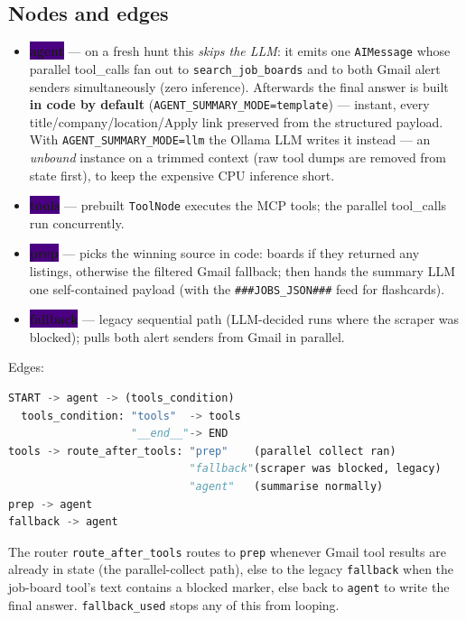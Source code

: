 \documentclass[11pt,a4paper]{article}
\newcommand{\tool}[1]{\texttt{#1}}
\newcommand{\nodepill}[1]{{\footnotesize\bfseries\color{white}\colorbox{indigo}{#1}}}
\begin{document}
\subsection{Nodes and edges}
\begin{itemize}
  \item \nodepill{agent} --- on a fresh hunt this \emph{skips the LLM}: it emits
        one \tool{AIMessage} whose parallel tool\_calls fan out to
        \tool{search\_job\_boards} and to both Gmail alert senders
        simultaneously (zero inference). Afterwards the final answer is built
        \textbf{in code by default} (\tool{AGENT\_SUMMARY\_MODE=template}) ---
        instant, every title/company/location/Apply link preserved from the
        structured payload. With \tool{AGENT\_SUMMARY\_MODE=llm} the Ollama LLM
        writes it instead --- an \emph{unbound} instance on a trimmed context
        (raw tool dumps are removed from state first), to keep the expensive
        CPU inference short.\par\nopagebreak
  \item \nodepill{tools} --- prebuilt \tool{ToolNode} executes the MCP tools;
        the parallel tool\_calls run concurrently.
  \item \nodepill{prep} --- picks the winning source in code: boards if they
        returned any listings, otherwise the filtered Gmail fallback; then
        hands the summary LLM one self-contained payload (with the
        \tool{###JOBS\_JSON###} feed for flashcards).
  \item \nodepill{fallback} --- legacy sequential path (LLM-decided runs where
        the scraper was blocked); pulls both alert senders from Gmail in
        parallel.
\end{itemize}

Edges:
\begin{lstlisting}[language=Python]
START -> agent -> (tools_condition)
  tools_condition: "tools"  -> tools
                   "__end__"-> END
tools -> route_after_tools: "prep"    (parallel collect ran)
                            "fallback"(scraper was blocked, legacy)
                            "agent"   (summarise normally)
prep -> agent
fallback -> agent
\end{lstlisting}

The router \tool{route\_after\_tools} routes to \tool{prep} whenever Gmail
tool results are already in state (the parallel-collect path), else to the
legacy \tool{fallback} when the job-board tool's text contains a blocked
marker, else back to \tool{agent} to write the final answer. \tool{fallback\_used}
stops any of this from looping.
\end{document}
